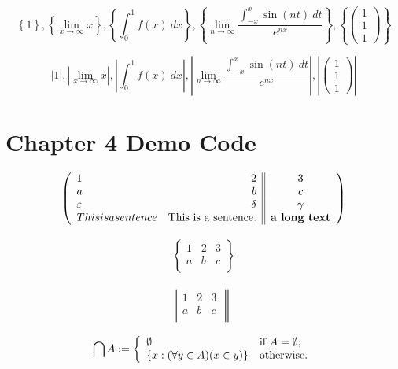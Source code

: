 \documentclass[12pt, a4paper]{article}
\begin{document}
\[ \left\{ 1 \right\} , 
\left\{ \lim_{x\to\infty} x \right\} , 
\left\{ \int^1_0 f(x)\ dx \right\} , 
\left\{ \lim_{n\to\infty} \frac{\int^x_{-x} \sin(nt)\ dt}{e^{nx}} \right\} , 
\left\{ \begin{pmatrix} 1 \\ 1 \\ 1 \end{pmatrix} \right\} \]

\[ \left| 1 \right| , 
\left| \lim_{x\to\infty} x \right| , 
\left| \int^1_0 f(x)\ dx \right| , 
\left| \lim_{n\to\infty} \frac{\int^x_{-x} \sin(nt)\ dt}{e^{nx}} \right| , 
\left| \begin{pmatrix} 1 \\ 1 \\ 1 \end{pmatrix} \right| \]



\newpage

\section{Chapter 4 Demo Code}
\begin{align*}
	\left(
	\begin{array}{lr||c}
		1 					& 2 							& 3\\
		a 					& b 							& c\\
		\varepsilon 		& \delta 						& \gamma \\ 
		This is a sentence & \textup{This is a sentence.} & \textup{\bf{a long text}} \\
	\end{array}
	\right)
\end{align*}


\begin{align*}
	\left\{
	\begin{array}{lrc}
		1 & 2 & 3\\
		a & b & c\\
	\end{array}
	\right\}
\end{align*}

\begin{align*}
	\left|
	\begin{array}{lrc}
		1 & 2 & 3\\
		a & b & c\\
	\end{array}
	\right\|
\end{align*}

\begin{align*}
	\bigcap A:=\left\{
		\begin{array}{ll}
			\emptyset & \textup{if $A=\emptyset$;}\\
			\{x:(\forall y\in A)(x\in y)\} & \textup{otherwise.}
		\end{array}
	\right.
\end{align*}
\end{document}
